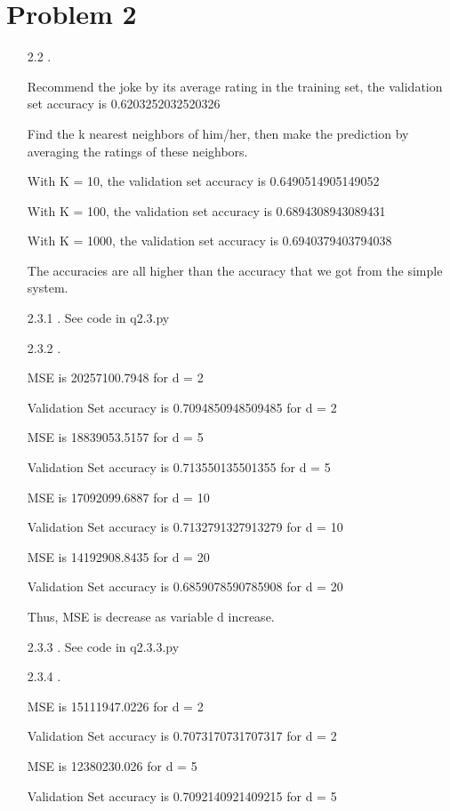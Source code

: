\documentclass[11pt]{article}
\begin{document}
\section*{Problem 2}
\begin{itemize}
\item[2.2].

Recommend the joke by its average rating in the training set, the validation set accuracy is 0.6203252032520326

Find the k nearest neighbors of him/her, then make the prediction by averaging the ratings of these neighbors.

With K = 10, the validation set accuracy is 0.6490514905149052

With K = 100, the validation set accuracy is 0.6894308943089431

With K = 1000, the validation set accuracy is  0.6940379403794038

The accuracies are all higher than the accuracy that we got from the simple system.

\item[2.3.1].
See code in q2.3.py

\item[2.3.2].

MSE is 20257100.7948 for d =  2

Validation Set accuracy is  0.7094850948509485 for d =  2

MSE is 18839053.5157 for d =  5

Validation Set accuracy is  0.713550135501355 for d =  5

MSE is 17092099.6887 for d =  10

Validation Set accuracy is  0.7132791327913279 for d =  10

MSE is 14192908.8435 for d =  20

Validation Set accuracy is  0.6859078590785908 for d =  20

Thus, MSE is decrease as variable d increase.

\item[2.3.3].
See code in q2.3.3.py

\item[2.3.4].

MSE is 15111947.0226 for d =  2

Validation Set accuracy is  0.7073170731707317 for d =  2

MSE is 12380230.026 for d =  5

Validation Set accuracy is  0.7092140921409215 for d =  5


\end{itemize}
\end{document}
